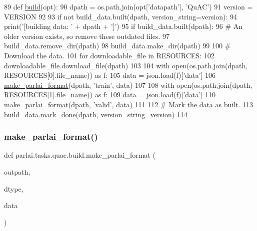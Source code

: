 \begin{DoxyCode}
89 \textcolor{keyword}{def }\hyperlink{namespacedialog__babi__feedback_1_1build_a7a9d289f7493a5ded13c4b7f071b6184}{build}(opt):
90     dpath = os.path.join(opt[\textcolor{stringliteral}{'datapath'}], \textcolor{stringliteral}{'QuAC'})
91     version = VERSION
92 
93     \textcolor{keywordflow}{if} \textcolor{keywordflow}{not} build\_data.built(dpath, version\_string=version):
94         print(\textcolor{stringliteral}{'[building data: '} + dpath + \textcolor{stringliteral}{']'})
95         \textcolor{keywordflow}{if} build\_data.built(dpath):
96             \textcolor{comment}{# An older version exists, so remove these outdated files.}
97             build\_data.remove\_dir(dpath)
98         build\_data.make\_dir(dpath)
99 
100         \textcolor{comment}{# Download the data.}
101         \textcolor{keywordflow}{for} downloadable\_file \textcolor{keywordflow}{in} RESOURCES:
102             downloadable\_file.download\_file(dpath)
103 
104         with open(os.path.join(dpath, RESOURCES[0].file\_name)) \textcolor{keyword}{as} f:
105             data = json.load(f)[\textcolor{stringliteral}{'data'}]
106             \hyperlink{namespaceparlai_1_1tasks_1_1quac_1_1build_a08c212462b5c58cde91192d35f24f0cc}{make\_parlai\_format}(dpath, \textcolor{stringliteral}{'train'}, data)
107 
108         with open(os.path.join(dpath, RESOURCES[1].file\_name)) \textcolor{keyword}{as} f:
109             data = json.load(f)[\textcolor{stringliteral}{'data'}]
110             \hyperlink{namespaceparlai_1_1tasks_1_1quac_1_1build_a08c212462b5c58cde91192d35f24f0cc}{make\_parlai\_format}(dpath, \textcolor{stringliteral}{'valid'}, data)
111 
112         \textcolor{comment}{# Mark the data as built.}
113         build\_data.mark\_done(dpath, version\_string=version)
114 \end{DoxyCode}
\mbox{\label{namespaceparlai_1_1tasks_1_1quac_1_1build_a08c212462b5c58cde91192d35f24f0cc}} 
\subsubsection{\texorpdfstring{make\+\_\+parlai\+\_\+format()}{make\_parlai\_format()}}
{\footnotesize\ttfamily def parlai.\+tasks.\+quac.\+build.\+make\+\_\+parlai\+\_\+format (\begin{DoxyParamCaption}\item[{}]{outpath,  }\item[{}]{dtype,  }\item[{}]{data }\end{DoxyParamCaption})}



